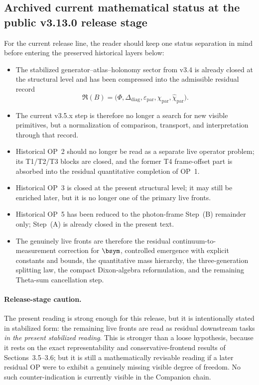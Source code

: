 \subsection*{Archived current mathematical status at the public v3.13.0 release stage}
For the current release line, the reader should keep one status separation in mind before entering the preserved historical layers below:
\begin{itemize}[leftmargin=2em]
  \item The stabilized generator--atlas--holonomy sector from v3.4 is already closed at the structural level and has been compressed into the admissible residual record
  \[
  \mathfrak R(B)=\bigl(\Phi,\Delta_{\mathrm{diag}},\varepsilon_{\mathrm{par}},\chi_{\mathrm{par}},\widehat\chi_{\mathrm{par}}\bigr).
  \]
  \item The current v3.5.x step is therefore no longer a search for new visible primitives, but a normalization of comparison, transport, and interpretation through that record.
  \item Historical OP~2 should no longer be read as a separate live operator problem; its T1/T2/T3 blocks are closed, and the former T4 frame-offset part is absorbed into the residual quantitative completion of OP~1.
  \item Historical OP~3 is closed at the present structural level; it may still be enriched later, but it is no longer one of the primary live fronts.
  \item Historical OP~5 has been reduced to the photon-frame Step~(B) remainder only; Step~(A) is already closed in the present text.
  \item The genuinely live fronts are therefore the residual continuum-to-measurement correction for \(\bsym\), controlled emergence with explicit constants and bounds, the quantitative mass hierarchy, the three-generation splitting law, the compact Dixon-algebra reformulation, and the remaining Theta-sum cancellation step.
\end{itemize}

\paragraph{Release-stage caution.}
The present reading is strong enough for this release, but it is intentionally stated in stabilized form: the remaining live fronts are read as residual downstream tasks \emph{in the present stabilized reading}. This is stronger than a loose hypothesis, because it rests on the exact representability and conservative-frontend results of Sections~3.5--3.6; but it is still a mathematically revisable reading if a later residual OP were to exhibit a genuinely missing visible degree of freedom. No such counter-indication is currently visible in the Companion chain.

